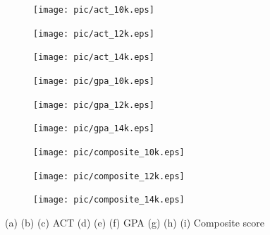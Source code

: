 \documentclass[12pt,english]{report}
\begin{document}

\begin{figure}
\centering
\begin{subfigure}{0.33\textwidth}
\texttt{[image: pic/act\_10k.eps]}
\caption{} %
\end{subfigure}\hspace*{\fill}
\begin{subfigure}{0.33\textwidth }
\texttt{[image: pic/act\_12k.eps]}
\caption{} %
\end{subfigure}\hspace*{\fill}
\begin{subfigure}{0.33\textwidth}
\texttt{[image: pic/act\_14k.eps]}
\caption{} %
\end{subfigure}\hspace*{\fill}

\medskip

\begin{subfigure}{0.33\textwidth}
\texttt{[image: pic/gpa\_10k.eps]}
\caption{} %
\end{subfigure}\hspace*{\fill}
\begin{subfigure}{0.33\textwidth }
\texttt{[image: pic/gpa\_12k.eps]}
\caption{} %
\end{subfigure}\hspace*{\fill}
\begin{subfigure}{0.33\textwidth}
\texttt{[image: pic/gpa\_14k.eps]}
\caption{} %
\end{subfigure}\hspace*{\fill}


\medskip

\begin{subfigure}{0.33\textwidth} 
\texttt{[image: pic/composite\_10k.eps]}
\caption{} %
\end{subfigure}\hspace*{\fill}
\begin{subfigure}{0.33\textwidth }
\texttt{[image: pic/composite\_12k.eps]}
\caption{} %
\end{subfigure}\hspace*{\fill}
\begin{subfigure}{0.33\textwidth}
\texttt{[image: pic/composite\_14k.eps]}
\caption{} %
\end{subfigure}\hspace*{\fill}
  \caption{(a) (b) (c) ACT  (d) (e) (f) GPA (g) (h) (i) Composite score}
  \label{allocation_results} 


\end{figure}
\end{document}
